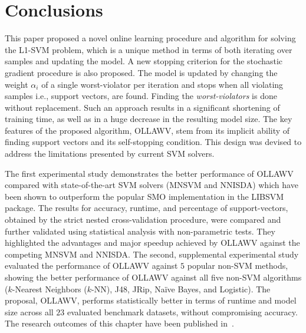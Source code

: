 \documentclass[reqno]{vcuthesis}
\numberwithin{equation}{chapter}
\begin{document}
\section{Conclusions}\label{sec:ollawvconclusion}
This paper proposed a novel online learning procedure and algorithm for solving the L1-SVM problem, which is a unique method in terms of both iterating over samples and updating the model. A new stopping criterion for the stochastic gradient procedure is also proposed. The model is updated by changing the weight $\alpha_i$ of a single worst-violator per iteration and stops when all violating samples i.e., support vectors, are found. Finding the \textit{worst-violators} is done without replacement. Such an approach results in a significant shortening of training time, as well as in a huge decrease in the resulting model size. The key features of the proposed algorithm, OLLAWV, stem from its implicit ability of finding support vectors and its self-stopping condition. This design was devised to address the limitations presented by current SVM solvers. 

The first experimental study demonstrates the better performance of OLLAWV compared with state-of-the-art SVM solvers (MNSVM and NNISDA) which have been shown to outperform the popular SMO implementation in the LIBSVM package. The results for accuracy, runtime, and percentage of support-vectors, obtained by the strict nested cross-validation procedure, were compared and further validated using statistical analysis with non-parametric tests. They highlighted the advantages and major speedup achieved by OLLAWV against the competing MNSVM and NNISDA. The second, supplemental experimental study evaluated the performance of OLLAWV against $5$ popular non-SVM methods, showing the better performance of OLLAWV against all five non-SVM algorithms ($k$-Nearest Neighbors ($k$-NN), J48, JRip, Na\"ive Bayes, and Logistic). The proposal, OLLAWV, performs statistically better in terms of runtime and model size across all $23$ evaluated benchmark datasets, without compromising accuracy. The research outcomes of this chapter have been published in~\cite{melki2018ollawv}.
\end{document}
